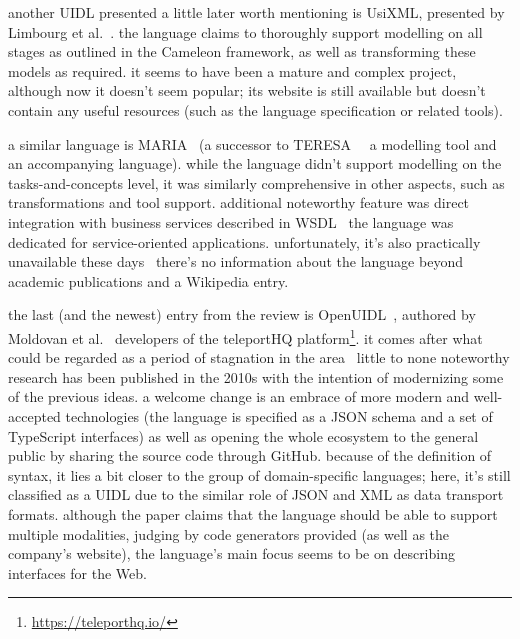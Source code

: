 another UIDL presented a little later worth mentioning is UsiXML, presented by Limbourg et al.~\cite{limbourg2004usixml,limbourgusixml}.
the language claims to thoroughly support modelling on all stages as outlined in the Cameleon framework, as well as transforming these models as required.
it seems to have been a mature and complex project, although now it doesn't seem popular;
its website is still available but doesn't contain any useful resources (such as the language specification or related tools).

a similar language is MARIA~\cite{Paterno2009-nj} (a successor to TERESA~\cite{Mori2004-sr} \textemdash\ a modelling tool and an accompanying language).
while the language didn't support modelling on the tasks-and-concepts level, it was similarly comprehensive in other aspects, such as transformations and tool support.
additional noteworthy feature was direct integration with business services described in WSDL \textemdash\ the language was dedicated for service-oriented applications.
unfortunately, it's also practically unavailable these days \textemdash\ there's no information about the language beyond academic publications and a Wikipedia entry.

the last (and the newest) entry from the review is OpenUIDL~\cite{moldovan2020open}, authored by Moldovan et al. \textemdash\ developers of the teleportHQ platform\footnote{\url{https://teleporthq.io/}}.
it comes after what could be regarded as a period of stagnation in the area \textemdash\ little to none noteworthy research has been published in the 2010s with the intention of modernizing some of the previous ideas.
a welcome change is an embrace of more modern and well-accepted technologies (the language is specified as a JSON schema and a set of TypeScript interfaces) as well as opening the whole ecosystem to the general public by sharing the source code through GitHub.
because of the definition of syntax, it lies a bit closer to the group of domain-specific languages;
here, it's still classified as a UIDL due to the similar role of JSON and XML as data transport formats.
although the paper claims that the language should be able to support multiple modalities, judging by code generators provided (as well as the company's website), the language's main focus seems to be on describing interfaces for the Web.

